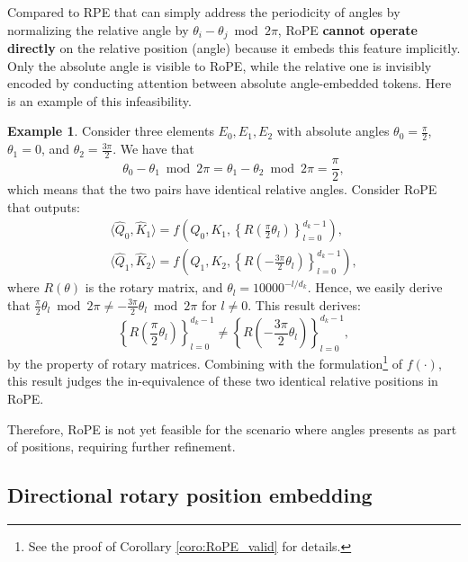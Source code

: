 \documentclass[lettersize,journal]{IEEEtran}
\theoremstyle{definition}
\newtheorem{example}{Example}
\begin{document}
Compared to RPE that can simply address the periodicity of angles by normalizing the relative angle by $\theta_i-\theta_j \bmod 2\pi$, RoPE \textbf{cannot operate directly} on the relative position (angle) because it embeds this feature implicitly.
Only the absolute angle is visible to RoPE, while the relative one is invisibly encoded by conducting attention between absolute angle-embedded tokens.
Here is an example of this infeasibility.


\begin{example}
Consider three elements \( E_0, E_1, E_2 \) with absolute angles \( \theta_0 = \frac{\pi}{2} \), \( \theta_1 =  0\), and \( \theta_2 = \frac{3\pi}{2} \). We have that
\begin{equation}
\theta_0 - \theta_1 \bmod 2\pi = \theta_1-\theta_2\bmod 2\pi = \frac{\pi}{2},
\end{equation}
which means that the two pairs have identical relative angles.
Consider RoPE that outputs:
\begin{gather}
    \langle \hat{Q}_0, \hat{K}_1 \rangle =f\left(Q_0,K_1, \left\{R\left(\frac{\pi}{2}\theta_l\right)\right\}_{l=0}^{d_k-1}\right),\\
     \langle \hat{Q}_1, \hat{K}_2 \rangle =f\left(Q_1,K_2, \left\{R\left(-\frac{3\pi}{2}\theta_l\right)\right\}_{l=0}^{d_k-1}\right),
\end{gather}
where $R(\theta)$ is the rotary matrix, and $\theta_l = 10000^{-l/d_k}$.
Hence, we easily derive that $\frac{\pi}{2}\theta_l \bmod 2\pi \neq -\frac{3\pi}{2}\theta_l \bmod 2\pi$ for $l\neq 0$.
This result derives:
\begin{equation}
  \left\{R\left(\frac{\pi}{2}\theta_l\right)\right\}_{l=0}^{d_k-1}  \neq \left\{R\left(-\frac{3\pi}{2}\theta_l\right)\right\}_{l=0}^{d_k-1},
\end{equation}
by the property of rotary matrices.
Combining with the formulation\footnote{See the proof of Corollary \ref{coro:RoPE_valid} for details.} of $f(\cdot)$, this result judges the in-equivalence of these two identical relative positions in RoPE.
\end{example}

Therefore, RoPE is not yet feasible for the scenario where angles presents as part of positions, requiring further refinement.

\subsection{Directional rotary position embedding}
\label{sec:rope_spatial}
\end{document}
